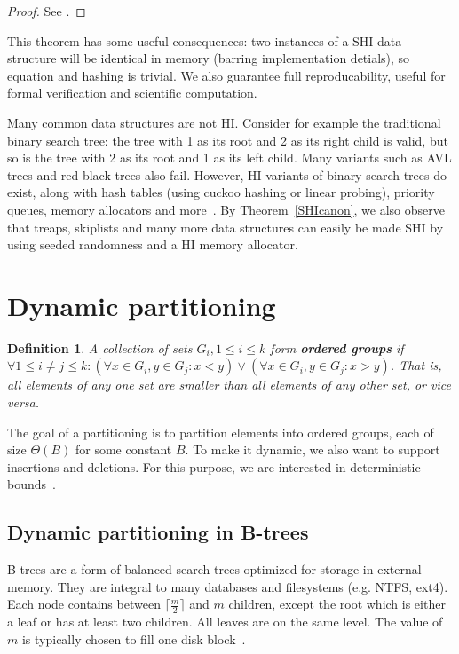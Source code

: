 \documentclass{article}
\newtheorem{definition}{Definition}
\begin{document}
\begin{proof}
    See \cite{SHIcanon}.
\end{proof}

This theorem has some useful consequences: two instances of a SHI data structure will be identical in memory (barring implementation detials), so equation and hashing is trivial. We also guarantee full reproducability, useful for formal verification and scientific computation.

Many common data structures are not HI. Consider for example the traditional binary search tree: the tree with 1 as its root and 2 as its right child is valid, but so is the tree with 2 as its root and 1 as its left child. Many variants such as AVL trees and red-black trees also fail. However, HI variants of binary search trees do exist, along with hash tables (using cuckoo hashing or linear probing), priority queues, memory allocators and more~\cite{HIDP}. By Theorem~\ref{SHIcanon}, we also observe that treaps, skiplists and many more data structures can easily be made SHI by using seeded randomness and a HI memory allocator.

\section{Dynamic partitioning}

\begin{definition}
    A collection of sets $G_i, 1 \le i \le k$ form \textbf{ordered groups} if $\forall 1 \le i \ne j \le k: (\forall x \in G_i, y \in G_j: x < y) \lor (\forall x \in G_i, y \in G_j: x > y)$. That is, all elements of any one set are smaller than all elements of any other set, or vice versa.
\end{definition}

The goal of a partitioning is to partition elements into ordered groups, each of size $\Theta(B)$ for some constant $B$. To make it dynamic, we also want to support insertions and deletions. For this purpose, we are interested in deterministic bounds~\cite{HIDP}.

\subsection{Dynamic partitioning in B-trees}

B-trees are a form of balanced search trees optimized for storage in external memory. They are integral to many databases and filesystems (e.g. NTFS, ext4). Each node contains between $\lceil \frac{m}{2} \rceil$ and $m$ children, except the root which is either a leaf or has at least two children. All leaves are on the same level. The value of $m$ is typically chosen to fill one disk block~\cite{Btree}.
\end{document}

